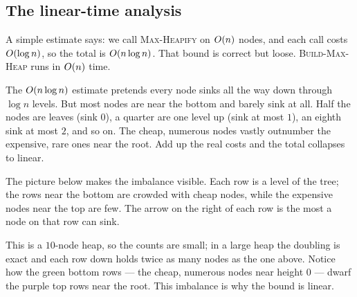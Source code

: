 \subsection{The linear-time analysis}

A simple estimate says: we call
\textsc{Max-Heapify} on $O(n)$ nodes, and each call costs $O(\log n)$, so the
total is $O(n\log n)$. That bound is correct but loose. \textsc{Build-Max-Heap} runs in $O(n)$ time.

\begin{intuitionbox}
The $O(n\log n)$ estimate pretends every node sinks all the way down through
$\log n$ levels. But most nodes are near the bottom and barely sink at all. Half
the nodes are leaves (sink $0$), a quarter are one level up (sink at most $1$), an
eighth sink at most $2$, and so on. The cheap, numerous nodes vastly outnumber
the expensive, rare ones near the root. Add up the real costs and the total
collapses to linear.
\end{intuitionbox}

The picture below makes the imbalance visible. Each row is a level of the tree;
the rows near the bottom are crowded with cheap nodes, while the expensive nodes
near the top are few. The arrow on the right of each row is the most a node on
that row can sink.

\begin{center}
\end{center}

This is a $10$-node heap, so the counts are small; in a large heap the doubling
is exact and each row down holds twice as many nodes as the one above. Notice how
the green bottom rows --- the cheap, numerous nodes near height $0$ --- dwarf the
purple top rows near the root. This imbalance is why the bound is linear.

